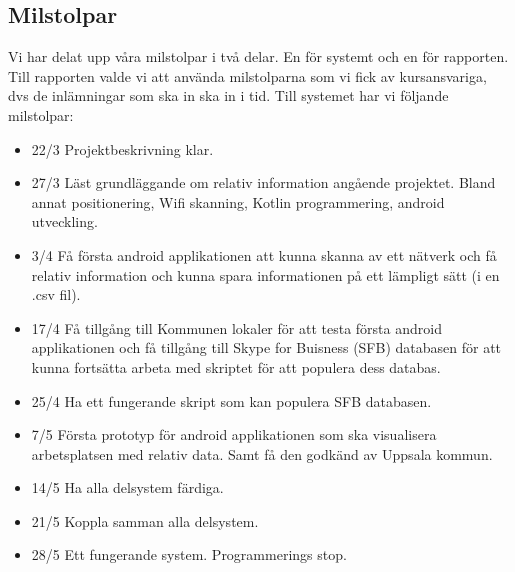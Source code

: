 \documentclass[a4paper,12pt]{article}
\begin{document}
\subsection{Milstolpar}
Vi har delat upp våra milstolpar i två delar. En för systemt och en för rapporten. Till rapporten valde vi att använda milstolparna som vi fick av kursansvariga, dvs de inlämningar som ska in ska in i tid. Till systemet har vi följande milstolpar:
\begin{itemize}
	\item 22/3 Projektbeskrivning klar.
	\item 27/3 Läst grundläggande om relativ information angående projektet. Bland annat positionering, Wifi skanning, Kotlin programmering, android utveckling.
	\item 3/4 Få första android applikationen att kunna skanna av ett nätverk och få relativ information och kunna spara informationen på ett lämpligt sätt (i en .csv fil).
	\item 17/4 Få tillgång till Kommunen lokaler för att testa första android applikationen och få tillgång till Skype for Buisness (SFB) databasen för att kunna fortsätta arbeta med skriptet för att populera dess databas.
 	\item 25/4 Ha ett fungerande skript som kan populera  SFB databasen.
	\item 7/5 Första prototyp för android applikationen som ska visualisera arbetsplatsen med relativ data. Samt få den godkänd av Uppsala kommun.
	\item 14/5 Ha alla delsystem färdiga.
	\item 21/5 Koppla samman alla delsystem.
	\item 28/5 Ett fungerande system. Programmerings stop.
\end{itemize}
\end{document}
